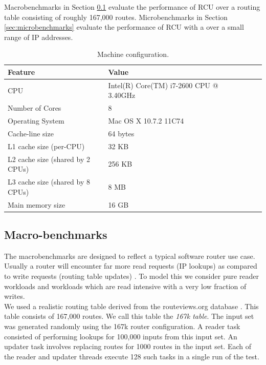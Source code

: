 \documentclass[a4paper]{article}
\begin{document}
Macrobenchmarks in Section \ref{sec:macrobenchmarks} evaluate the performance of RCU over a routing table consisting of roughly 167,000 routes. Microbenchmarks in Section \ref{sec:microbenchmarks} evaluate the performance of RCU with a over a small range of IP addresses.

\begin{table}
\begin{center}
\begin{tabular}{|l|l|l|l|l|l|}
\hline Feature & Value\\
\hline CPU &Intel(R) Core(TM) i7-2600 CPU @ 3.40GHz\\
\hline Number of Cores & 8\\
\hline Operating System & Mac OS X 10.7.2 11C74\\
\hline Cache-line size & 64 bytes\\
\hline L1 cache size (per-CPU) & 32 KB\\
\hline L2 cache size (shared by 2 CPUs) & 256 KB\\
\hline L3 cache size (shared by 8 CPUs)& 8 MB\\
\hline Main memory size & 16 GB\\
\hline
\end{tabular}
\end{center}
\caption{Machine configuration.}
\label{tbl:machinemac}
\end{table}

\subsection{Macro-benchmarks}
\label{sec:macrobenchmarks}

The macrobenchmarks are designed to reflect a typical software router
use case. Usually a router will encounter far more read requests (IP
lookups) as compared to write requests (routing table updates) . To
model this we consider pure reader workloads and workloads which are
read intensive with a very low fraction of writes.\\

We used a realistic routing table derived from the routeviews.org
database \cite{routeviews}. This table consists of 167,000 routes. We call this table
the \emph{167k table}. The input set was generated randomly using the
167k router configuration. A reader task consisted of performing
lookups for 100,000 inputs from this input set. An updater task
involves replacing routes for 1000 routes in the input set. Each of
the reader and updater threads execute 128 such tasks in a single run
of the test.\\
\end{document}

